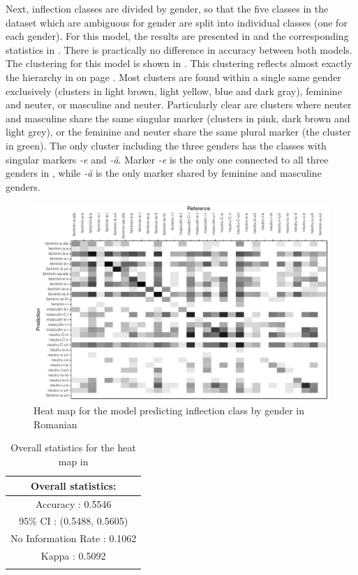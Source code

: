 Next, inflection classes are divided by gender, so that the five classes in the dataset which are ambiguous for gender are split into individual classes (one for each gender). For this model, the results are presented in  and the corresponding statistics in . There is practically no difference in accuracy between both models. The clustering for this model is shown in . This clustering reflects almost exactly the hierarchy in  on page \pageref{fig:romanian-hierar-markers-2}. Most clusters are found within a single same gender exclusively (clusters in light brown, light yellow, blue and dark gray), feminine and neuter, or masculine and neuter. Particularly clear are clusters where neuter and masculine share the same singular marker (clusters in pink, dark brown and light grey), or the feminine and neuter share the same plural marker (the cluster in green).  The only cluster including the three genders has the classes with singular markers \textit{-e} and \textit{-ă}. Marker \textit{-e} is the only one connected to all three genders in , while \textit{-ă} is the only marker shared by feminine and masculine genders.

\begin{figure}
  \centering
  \includegraphics[width=1.0\textwidth]{./figures/romanian/class-2-cm.pdf}
  \caption{Heat map for the model predicting inflection class by gender in Romanian}\label{fig:class-2-cm-romanian}
\end{figure}

\begin{table}
  \centering
  \begin{tabular}{c}
    \lsptoprule
    Overall statistics: \\
    \midrule
    Accuracy : 0.5546\\
    95\% CI : (0.5488, 0.5605)\\
    No Information Rate : 0.1062\\
    Kappa : 0.5092\\
    \lspbottomrule
  \end{tabular}
  \caption{Overall statistics for the heat map in }\label{tab:class-2-romanian-stats}
\end{table}

